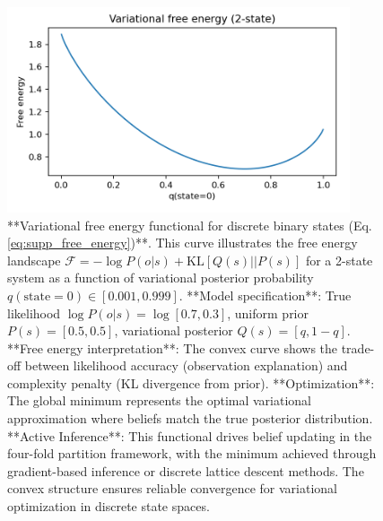 \documentclass[
  10pt,
]{article}
\begin{document}
\begin{figure}[htbp]
\centering
\includegraphics[width=0.9\textwidth]{figures/free_energy_curve.png}
\caption{**Variational free energy functional for discrete binary states (Eq. \ref{eq:supp_free_energy})**. This curve illustrates the free energy landscape $\mathcal{F} = -\log P(o|s) + \text{KL}[Q(s)||P(s)]$ for a 2-state system as a function of variational posterior probability $q(\text{state}=0) \in [0.001, 0.999]$. **Model specification**: True likelihood $\log P(o|s) = \log[0.7, 0.3]$, uniform prior $P(s) = [0.5, 0.5]$, variational posterior $Q(s) = [q, 1-q]$. **Free energy interpretation**: The convex curve shows the trade-off between likelihood accuracy (observation explanation) and complexity penalty (KL divergence from prior). **Optimization**: The global minimum represents the optimal variational approximation where beliefs match the true posterior distribution. **Active Inference**: This functional drives belief updating in the four-fold partition framework, with the minimum achieved through gradient-based inference or discrete lattice descent methods. The convex structure ensures reliable convergence for variational optimization in discrete state spaces.}
\label{fig:free_energy_curve}
\end{figure}
\end{document}
